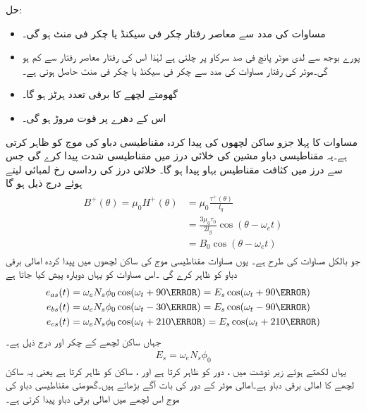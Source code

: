 حل:
\begin{itemize}
\item
مساوات   کی مدد سے معاصر رفتار  چکر فی سیکنڈ یا  چکر فی منٹ ہو گی۔
\item
پورے بوجھ سے لدی موٹر پانچ فی صد سرکاو پر چلتی ہے لہٰذا اس کی رفتار معاصر رفتار سے  کم ہو گی۔موٹر کی رفتار مساوات    کی مدد سے  چکر فی سیکنڈ یا  چکر فی منٹ حاصل ہوتی ہے۔
\item
گھومتے لچھے کا برقی تعدد   ہرٹز ہو گا۔
\item
اس کے دھرے پر قوت مروڑ  ہو گی۔
\end{itemize}
%
مساوات   کا پہلا جزو ساکن لچھوں کی پیدا کردہ مقناطیسی دباو کی موج  کو ظاہر کرتی ہے۔یہ مقناطیسی دباو مشین کی خلائی درز میں مقناطیسی شدت  پیدا کرے گی جس سے درز میں  کثافت مقناطیس بہاو  پیدا ہو گا۔ خلائی درز کی رداسی رخ  لمبائی  لیتے ہوئے درج ذیل ہو گا
\begin{gather}
\begin{aligned}\label{مساوات_امالی-سرک_تعلق_پ}
B^+(\theta)=\mu_0 H^+(\theta)&=\mu_0 \frac{\tau^+(\theta)}{l_g}\\
&=\frac{3 \mu_0 \tau_0}{2 l_g} \cos (\theta-\omega_e t)\\
&=B_0 \cos (\theta-\omega_e t)
\end{aligned}
\end{gather}
جو بالکل مساوات   کی طرح ہے۔ یوں مساوات    مقناطیسی موج  کی ساکن لچھوں میں پیدا کردہ امالی برقی دباو کو ظاہر کرے گی ۔اس مساوات کو یہاں دوبارہ پیش کیا جاتا ہے
\begin{gather}
\begin{aligned}\label{مساوات_امالی_تین_دور_سائن_نما_برقی_دباو}
e_{as}(t)&=\omega_e N_s \phi_0 \cos (\omega_t +90\degree)=E_s \cos (\omega_t +90\degree)\\
e_{bs}(t)&=\omega_e N_s \phi_0 \cos (\omega_t -30\degree)=E_s \cos (\omega_t -90\degree)\\
e_{cs}(t)&=\omega_e N_s \phi_0 \cos (\omega_t +210\degree)=E_s \cos (\omega_t +210\degree)
\end{aligned}
\end{gather}
جہاں  ساکن لچھے کے چکر  اور  درج ذیل ہے۔
\begin{align}
E_s=\omega_e N_s \phi_0
\end{align}
یہاں   لکھتے ہوئے  زیر نوشت  میں  ،  دور  کو ظاہر کرتا ہے اور ، ساکن کو ظاہر کرتا ہے یعنی یہ ساکن   لچھے کا امالی برقی دباو ہے۔امالی موٹر کے  دور   کی بات آگے بڑھاتے ہیں۔گھومتی مقناطیسی دباو کی موج اس  لچھے میں امالی برقی دباو  پیدا کرتی ہے۔

